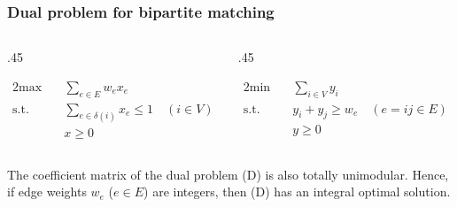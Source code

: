 \documentclass[14pt,aspectratio=169,xcolor=dvipsnames,table,onlytextwidth]{beamer}
\begin{document}
\begin{frame}
    \frametitle{Dual problem for bipartite matching}
    \small

    \begin{columns}[T]
    \begin{column}{.45\textwidth}
    \begin{primal}
        \setlength{\abovedisplayskip}{0pt}
        \begin{alignat*}{2}
            \text{max} & \quad  \sum_{e \in E} w_e x_e \\
            \text{s.t.} & \quad \sum_{e \in \delta(i)} x_e \leq 1  \quad (i \in V) \\
            & \quad x \geq 0
        \end{alignat*}
    \end{primal}
    \end{column}
    \begin{column}{.45\textwidth}
    \begin{dual}
        \setlength{\abovedisplayskip}{0pt}
        \begin{alignat*}{2}
            \text{min} & \quad  \sum_{i \in V} y_i \\
            \text{s.t.} & \quad y_i + y_j \geq w_e \quad (e=ij \in E) \\
            & \quad y \geq 0
        \end{alignat*}
    \end{dual}
    \end{column}
    \end{columns}

    \vfill
    The coefficient matrix of the dual problem (D) is also totally unimodular.
    Hence, if edge weights $w_e$ ($e \in E$) are integers, then (D) has an integral optimal solution.
\end{frame}
\end{document}
